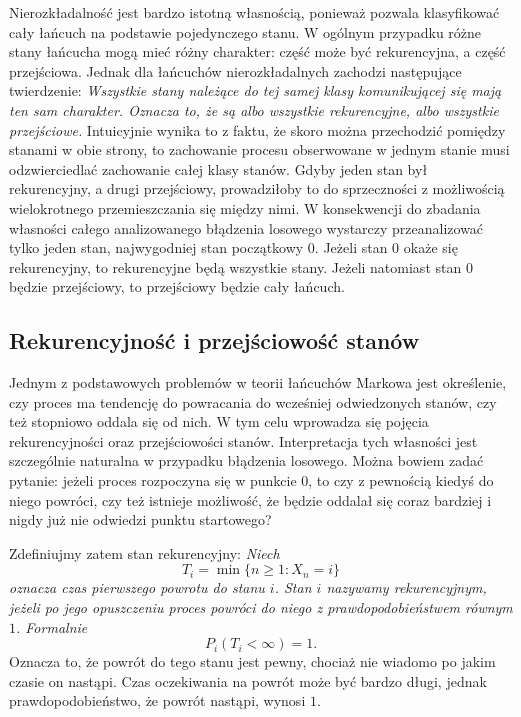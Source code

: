 Nierozkładalność jest bardzo istotną własnością, ponieważ pozwala klasyfikować cały łańcuch na podstawie pojedynczego stanu. W ogólnym przypadku różne stany łańcucha mogą mieć różny charakter: część może być rekurencyjna, a część przejściowa. Jednak dla łańcuchów nierozkładalnych zachodzi następujące twierdzenie:\newline
\textit{Wszystkie stany należące do tej samej klasy komunikującej się mają ten sam charakter. Oznacza to, że są albo wszystkie rekurencyjne, albo wszystkie przejściowe.}\newline
Intuicyjnie wynika to z faktu, że skoro można przechodzić pomiędzy stanami w obie strony, to zachowanie procesu obserwowane w jednym stanie musi odzwierciedlać zachowanie całej klasy stanów. Gdyby jeden stan był rekurencyjny, a drugi przejściowy, prowadziłoby to do sprzeczności z możliwością wielokrotnego przemieszczania się między nimi. W konsekwencji do zbadania własności całego analizowanego błądzenia losowego wystarczy przeanalizować tylko jeden stan, najwygodniej stan początkowy $0$. Jeżeli stan $0$ okaże się rekurencyjny, to rekurencyjne będą wszystkie stany. Jeżeli natomiast stan $0$ będzie przejściowy, to przejściowy będzie cały łańcuch.

\subsection{Rekurencyjność i przejściowość stanów}
Jednym z podstawowych problemów w teorii łańcuchów Markowa jest określenie, czy proces ma tendencję do powracania do wcześniej odwiedzonych stanów, czy też stopniowo oddala się od nich.
W tym celu wprowadza się pojęcia rekurencyjności oraz przejściowości stanów. Interpretacja tych własności jest szczególnie naturalna w przypadku błądzenia losowego.
Można bowiem zadać pytanie: jeżeli proces rozpoczyna się w punkcie 0, to czy z pewnością kiedyś do niego powróci, czy też istnieje możliwość, że będzie oddalał się coraz bardziej i nigdy już nie odwiedzi punktu startowego?

Zdefiniujmy zatem stan rekurencyjny:\newline
\textit{Niech}
$$T_i = \min\{n \geq 1: X_n=i\}$$
\textit{oznacza czas pierwszego powrotu do stanu $i$. Stan $i$ nazywamy rekurencyjnym, jeżeli po jego opuszczeniu proces powróci do niego z prawdopodobieństwem równym $1$. Formalnie}
$$P_i(T_i<\infty)=1.$$
Oznacza to, że powrót do tego stanu jest pewny, chociaż nie wiadomo po jakim czasie on nastąpi. Czas oczekiwania na powrót może być bardzo długi, jednak prawdopodobieństwo, że powrót nastąpi, wynosi $1$.

